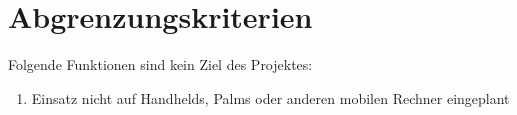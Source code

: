 \section{Abgrenzungskriterien}
Folgende Funktionen sind kein Ziel des Projektes:
\renewcommand{\labelenumi}{/A\arabic{enumi}0/}
\begin{enumerate}
    \setlength\itemsep{-1em}
    \item Einsatz nicht auf Handhelds, Palms oder anderen mobilen Rechner eingeplant 
\end{enumerate}
\renewcommand{\labelenumi}{\arabic{enumi}}